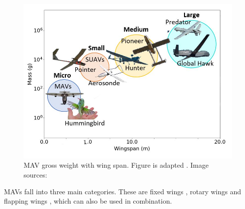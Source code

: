 \begin{figure}[H]
  \centering
   \includegraphics[width=\linewidth]{01_Introduction/Figs/replacement.JPG}
  \caption{\acrshort{MAV} gross weight with wing span. Figure is adapted \cite{uavsize}. Image sources: \cite{MAVImage, Hummingbird, Ava, Aerosonde, hunter, pioneer, MQ9, hawk}}
  \label{fig:sizes}
\end{figure}


\acrshort{MAV}s fall into three main categories. These are fixed wings \cite{Stanford2008}, rotary wings \cite{Lasek2001} and flapping wings \cite{Platzer2012}, which can also be used in combination.







